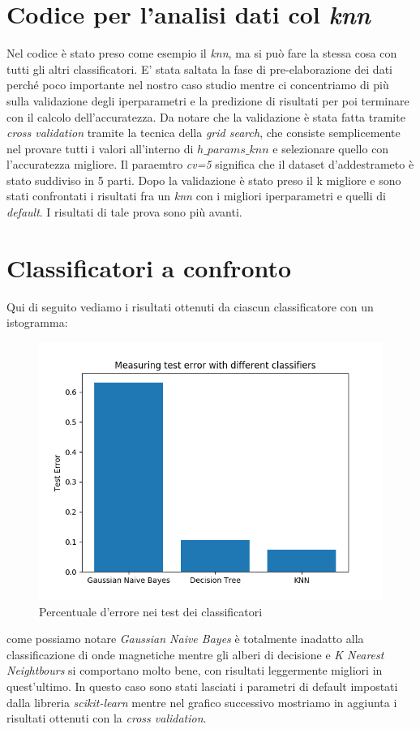 \section{Codice per l'analisi dati col \textit{knn}}

Nel codice \`e stato preso come esempio il \textit{knn}, ma si pu\`o fare la stessa cosa con tutti gli altri classificatori. E' stata saltata la fase di pre-elaborazione dei dati perch\'e poco importante nel nostro caso studio mentre ci concentriamo di pi\`u  sulla validazione degli iperparametri e la predizione di risultati per poi terminare con il calcolo dell'accuratezza. Da notare che la validazione \`e stata fatta tramite \textit{cross validation} tramite la tecnica della \textit{grid search}, che consiste semplicemente nel provare tutti i valori all'interno di \textit{$h\_params\_knn$} e selezionare quello con l'accuratezza migliore. Il paraemtro \textit{cv=5} significa che il dataset d'addestrameto \`e stato suddiviso in 5 parti. Dopo la validazione \`e stato preso il k migliore e sono stati confrontati i risultati fra un \textit{knn} con i migliori iperparametri e quelli di \textit{default}. I risultati di tale prova sono pi\`u  avanti.


\section{Classificatori a confronto}
Qui di seguito vediamo i risultati ottenuti da ciascun classificatore con un istogramma:

\begin{figure}[H]
	\centering
	\includegraphics[width=0.7\linewidth]{img/test_errors}
	\caption{Percentuale d'errore nei test dei classificatori}
	\label{fig:testerrors}
\end{figure}

come possiamo notare \textit{Gaussian Naive Bayes} \`e totalmente inadatto alla classificazione di onde magnetiche mentre gli alberi di decisione e \textit{K Nearest Neightbours} si comportano molto bene, con risultati leggermente migliori in quest'ultimo.
In questo caso sono stati lasciati i parametri di default impostati dalla libreria \textit{scikit-learn} mentre nel grafico successivo mostriamo in aggiunta i risultati ottenuti con la \textit{cross validation}.

